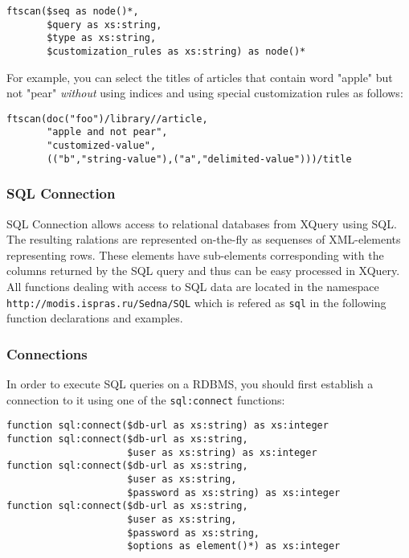 \documentclass[a4paper,12pt]{article}
\begin{document}
\begin{verbatim}
ftscan($seq as node()*,
       $query as xs:string,
       $type as xs:string,
       $customization_rules as xs:string) as node()*
\end{verbatim}

For example, you can select the titles of articles that contain word "apple" but
not "pear" \emph{without} using indices and using special customization rules as
follows:

\begin{verbatim}
ftscan(doc("foo")/library//article,
       "apple and not pear",
       "customized-value",
       (("b","string-value"),("a","delimited-value")))/title
\end{verbatim}


\subsubsection{SQL Connection}

SQL Connection allows access to relational databases from XQuery using SQL. The
resulting ralations are represented on-the-fly as sequenses of XML-elements
representing rows. These elements have sub-elements corresponding with the
columns returned by the SQL query and thus can be easy processed in XQuery. All
functions dealing with access to SQL data are located in the namespace
\verb!http://modis.ispras.ru/Sedna/SQL! which is refered as \verb!sql! in the
following function declarations and examples.


\subsubsection*{Connections} In order to execute SQL queries on a RDBMS, you
should first establish a connection to it using one of the \verb!sql:connect!
functions:

\begin{verbatim}
function sql:connect($db-url as xs:string) as xs:integer
function sql:connect($db-url as xs:string,
                     $user as xs:string) as xs:integer
function sql:connect($db-url as xs:string,
                     $user as xs:string,
                     $password as xs:string) as xs:integer
function sql:connect($db-url as xs:string,
                     $user as xs:string,
                     $password as xs:string,
                     $options as element()*) as xs:integer
\end{verbatim}
\end{document}
